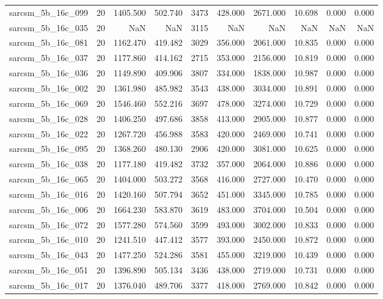 \begin{tabular}{lrrrrrrrrr}
sarcsm\_5b\_16c\_099 & 20 & 1405.500 & 502.740 & 3473 & 428.000 & 2671.000 & 10.698 & 0.000 & 0.000 \\
sarcsm\_5b\_16c\_035 & 20 & NaN & NaN & 3115 & NaN & NaN & NaN & NaN & NaN \\
sarcsm\_5b\_16c\_081 & 20 & 1162.470 & 419.482 & 3029 & 356.000 & 2061.000 & 10.835 & 0.000 & 0.000 \\
sarcsm\_5b\_16c\_037 & 20 & 1177.860 & 414.162 & 2715 & 353.000 & 2156.000 & 10.819 & 0.000 & 0.000 \\
sarcsm\_5b\_16c\_036 & 20 & 1149.890 & 409.906 & 3807 & 334.000 & 1838.000 & 10.987 & 0.000 & 0.000 \\
sarcsm\_5b\_16c\_002 & 20 & 1361.980 & 485.982 & 3543 & 438.000 & 3034.000 & 10.891 & 0.000 & 0.000 \\
sarcsm\_5b\_16c\_069 & 20 & 1546.460 & 552.216 & 3697 & 478.000 & 3274.000 & 10.729 & 0.000 & 0.000 \\
sarcsm\_5b\_16c\_028 & 20 & 1406.250 & 497.686 & 3858 & 413.000 & 2905.000 & 10.877 & 0.000 & 0.000 \\
sarcsm\_5b\_16c\_022 & 20 & 1267.720 & 456.988 & 3583 & 420.000 & 2469.000 & 10.741 & 0.000 & 0.000 \\
sarcsm\_5b\_16c\_095 & 20 & 1368.260 & 480.130 & 2906 & 420.000 & 3081.000 & 10.625 & 0.000 & 0.000 \\
sarcsm\_5b\_16c\_038 & 20 & 1177.180 & 419.482 & 3732 & 357.000 & 2064.000 & 10.886 & 0.000 & 0.000 \\
sarcsm\_5b\_16c\_065 & 20 & 1404.000 & 503.272 & 3568 & 416.000 & 2727.000 & 10.470 & 0.000 & 0.000 \\
sarcsm\_5b\_16c\_016 & 20 & 1420.160 & 507.794 & 3652 & 451.000 & 3345.000 & 10.785 & 0.000 & 0.000 \\
sarcsm\_5b\_16c\_006 & 20 & 1664.230 & 583.870 & 3619 & 483.000 & 3704.000 & 10.504 & 0.000 & 0.000 \\
sarcsm\_5b\_16c\_072 & 20 & 1577.280 & 574.560 & 3599 & 493.000 & 3002.000 & 10.833 & 0.000 & 0.000 \\
sarcsm\_5b\_16c\_010 & 20 & 1241.510 & 447.412 & 3577 & 393.000 & 2450.000 & 10.872 & 0.000 & 0.000 \\
sarcsm\_5b\_16c\_043 & 20 & 1477.250 & 524.286 & 3581 & 455.000 & 3219.000 & 10.439 & 0.000 & 0.000 \\
sarcsm\_5b\_16c\_051 & 20 & 1396.890 & 505.134 & 3436 & 438.000 & 2719.000 & 10.731 & 0.000 & 0.000 \\
sarcsm\_5b\_16c\_017 & 20 & 1376.040 & 489.706 & 3377 & 418.000 & 2769.000 & 10.842 & 0.000 & 0.000 \\

\end{tabular}
